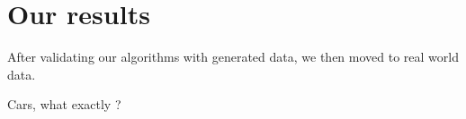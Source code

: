 \section{Our results}
	After validating our algorithms with generated data, we then moved to real world data.

	Cars, what exactly ?